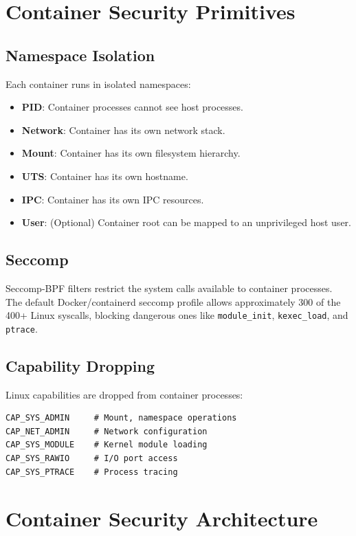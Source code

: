 \section{Container Security Primitives}

\subsection{Namespace Isolation}

Each container runs in isolated namespaces:
\begin{itemize}[nosep]
  \item \textbf{PID}: Container processes cannot see host processes.
  \item \textbf{Network}: Container has its own network stack.
  \item \textbf{Mount}: Container has its own filesystem hierarchy.
  \item \textbf{UTS}: Container has its own hostname.
  \item \textbf{IPC}: Container has its own IPC resources.
  \item \textbf{User}: (Optional) Container root can be mapped to an
        unprivileged host user.
\end{itemize}

\subsection{Seccomp}

Seccomp-BPF filters restrict the system calls available to container
processes. The default Docker/containerd seccomp profile allows
approximately 300 of the 400+ Linux syscalls, blocking dangerous ones
like \texttt{module\_init}, \texttt{kexec\_load}, and \texttt{ptrace}.

\subsection{Capability Dropping}

Linux capabilities are dropped from container processes:
\begin{lstlisting}
CAP_SYS_ADMIN     # Mount, namespace operations
CAP_NET_ADMIN     # Network configuration
CAP_SYS_MODULE    # Kernel module loading
CAP_SYS_RAWIO     # I/O port access
CAP_SYS_PTRACE    # Process tracing
\end{lstlisting}


\section{Container Security Architecture}

